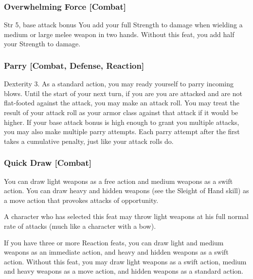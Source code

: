 \subsubsection{Overwhelming Force [Combat]}
 Str 5, base attack bonus 
 You add your full Strength to damage when wielding a medium or large melee weapon in two hands.
 Without this feat, you add half your Strength to damage.

\subsubsection{Parry [Combat, Defense, Reaction]}
\featpre Dexterity 3.
\featben As a standard action, you may ready yourself to parry incoming blows. Until the start of your next turn, if you are you are attacked and are not flat-footed against the attack, you may make an attack roll. You may treat the result of your attack roll as your armor class against that attack if it would be higher. If your base attack bonus is high enough to grant you multiple attacks, you may also make multiple parry attempts. Each parry attempt after the first takes a cumulative  penalty, just like your attack rolls do.

\subsubsection{Quick Draw [Combat]}
 You can draw light weapons as a free action and medium weapons as a swift action. You can draw heavy and hidden weapons (see the Sleight of Hand skill) as a move action that provokes attacks of opportunity.
\par A character who has selected this feat may throw light weapons at his full normal rate of attacks (much like a character with a bow).

If you have three or more Reaction feats, you can draw light and medium weapons as an immediate action, and heavy and hidden weapons as a swift action.
 Without this feat, you may draw light weapons as a swift action, medium and heavy weapons as a move action, and hidden weapons as a standard action.


